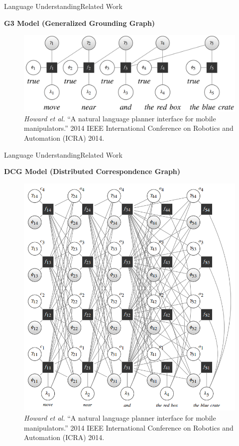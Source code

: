 \begin{frame}{Language Understanding}{Related Work}

{\bf G3 Model (Generalized Grounding Graph)\footnotemark }

\begin{figure}
	\centering
	\includegraphics[width=.7\linewidth]{figure/G3}
	\caption{ \tiny{ {\it Howard et al.} ``A natural language planner interface for mobile manipulators.'' 2014 IEEE International Conference on Robotics and Automation (ICRA) 2014. } }
\end{figure}


\end{frame}

\begin{frame}{Language Understanding}{Related Work}

{\bf DCG Model (Distributed Correspondence Graph)\footnotemark }

\begin{figure}
	\centering
	\includegraphics[width=.35\linewidth]{figure/DCG}
	\caption{ \tiny{ {\it Howard et al.} ``A natural language planner interface for mobile manipulators.'' 2014 IEEE International Conference on Robotics and Automation (ICRA) 2014. } }
\end{figure}


\end{frame}

